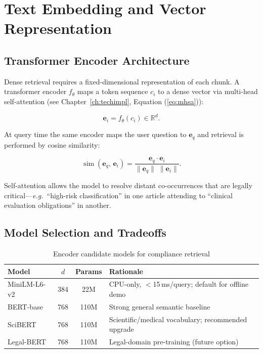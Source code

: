\section{Text Embedding and Vector Representation}
\label{sec:rag-embed-full}

\subsection{Transformer Encoder Architecture}
\label{sec:rag-embed-arch}

Dense retrieval requires a fixed-dimensional representation of each chunk. A
transformer encoder $f_\theta$ maps a token sequence $c_i$ to a dense vector via
multi-head self-attention (see Chapter~\ref{ch:techimpl}, Equation
(\ref{eq:mhsa})):

\begin{equation}
\label{eq:embed-chunk}
\mathbf{e}_i = f_\theta(c_i) \in \mathbb{R}^{d}.
\end{equation}

At query time the same encoder maps the user question to $\mathbf{e}_q$ and
retrieval is performed by cosine similarity:

\begin{equation}
\label{eq:cosine-rag}
\operatorname{sim}(\mathbf{e}_q,\,\mathbf{e}_i)
= \frac{\mathbf{e}_q \cdot \mathbf{e}_i}{\|\mathbf{e}_q\|\;\|\mathbf{e}_i\|}.
\end{equation}

Self-attention allows the model to resolve distant co-occurrences that are
legally critical---\textit{e.g.}\ ``high-risk classification'' in one article
attending to ``clinical evaluation obligations'' in another.

\subsection{Model Selection and Tradeoffs}
\label{sec:rag-embed-models}

\begin{table}[htbp]
\centering
\caption{Encoder candidate models for compliance retrieval}
\label{tab:rag-encoders}
\begin{tabular}{@{}p{2.8cm}ccp{5.0cm}@{}}
\toprule
\textbf{Model} & $d$ & \textbf{Params} & \textbf{Rationale} \\
\midrule
MiniLM-L6-v2       & 384 & 22M  & CPU-only, $<$15\,ms/query; default for offline demo \\
BERT-base~\cite{devlin2019}           & 768 & 110M & Strong general semantic baseline \\
SciBERT~\cite{beltagy2019}            & 768 & 110M & Scientific/medical vocabulary; recommended upgrade \\
Legal-BERT         & 768 & 110M & Legal-domain pre-training (future option) \\
\bottomrule
\end{tabular}
\end{table}

